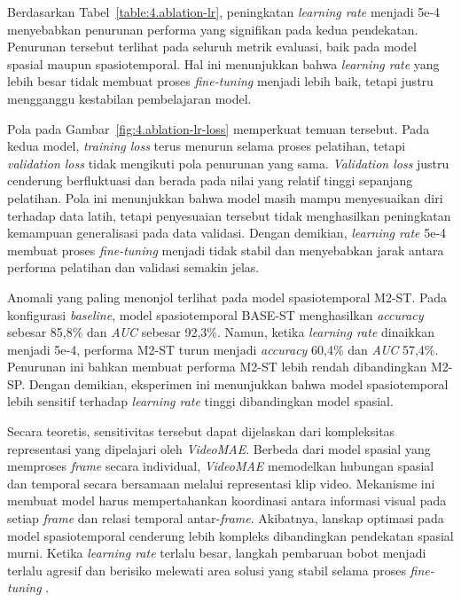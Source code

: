 Berdasarkan Tabel~\ref{table:4.ablation-lr}, peningkatan \textit{learning rate} menjadi 5e-4 menyebabkan penurunan performa yang signifikan pada kedua pendekatan. Penurunan tersebut terlihat pada seluruh metrik evaluasi, baik pada model spasial maupun spasiotemporal. Hal ini menunjukkan bahwa \textit{learning rate} yang lebih besar tidak membuat proses \textit{fine-tuning} menjadi lebih baik, tetapi justru mengganggu kestabilan pembelajaran model.

Pola pada Gambar~\ref{fig:4.ablation-lr-loss} memperkuat temuan tersebut. Pada kedua model, \textit{training loss} terus menurun selama proses pelatihan, tetapi \textit{validation loss} tidak mengikuti pola penurunan yang sama. \textit{Validation loss} justru cenderung berfluktuasi dan berada pada nilai yang relatif tinggi sepanjang pelatihan. Pola ini menunjukkan bahwa model masih mampu menyesuaikan diri terhadap data latih, tetapi penyesuaian tersebut tidak menghasilkan peningkatan kemampuan generalisasi pada data validasi. Dengan demikian, \textit{learning rate} 5e-4 membuat proses \textit{fine-tuning} menjadi tidak stabil dan menyebabkan jarak antara performa pelatihan dan validasi semakin jelas.

Anomali yang paling menonjol terlihat pada model spasiotemporal M2-ST. Pada konfigurasi \textit{baseline}, model spasiotemporal BASE-ST menghasilkan \textit{accuracy} sebesar 85,8\% dan \textit{AUC} sebesar 92,3\%. Namun, ketika \textit{learning rate} dinaikkan menjadi 5e-4, performa M2-ST turun menjadi \textit{accuracy} 60,4\% dan \textit{AUC} 57,4\%. Penurunan ini bahkan membuat performa M2-ST lebih rendah dibandingkan M2-SP. Dengan demikian, eksperimen ini menunjukkan bahwa model spasiotemporal lebih sensitif terhadap \textit{learning rate} tinggi dibandingkan model spasial.

Secara teoretis, sensitivitas tersebut dapat dijelaskan dari kompleksitas representasi yang dipelajari oleh \textit{VideoMAE}. Berbeda dari model spasial yang memproses \textit{frame} secara individual, \textit{VideoMAE} memodelkan hubungan spasial dan temporal secara bersamaan melalui representasi klip video. Mekanisme ini membuat model harus mempertahankan koordinasi antara informasi visual pada setiap \textit{frame} dan relasi temporal antar-\textit{frame}. Akibatnya, lanskap optimasi pada model spasiotemporal cenderung lebih kompleks dibandingkan pendekatan spasial murni. Ketika \textit{learning rate} terlalu besar, langkah pembaruan bobot menjadi terlalu agresif dan berisiko melewati area solusi yang stabil selama proses \textit{fine-tuning} \cite{tong2022videomaemaskedautoencodersdataefficient,Gu2021}.

